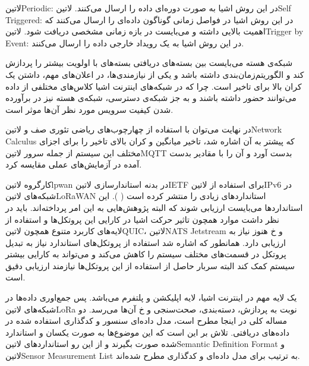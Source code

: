  ‌لاتین{Periodic}: در این روش اشیا به صورت دوره‌ای داده را ارسال می‌کنند.
 ‌لاتین{Self Triggered}: در این روش اشیا در فواصل زمانی گوناگون داده‌ای را ارسال می‌کنند که اهمیت بالایی داشته و می‌بایست در بازه زمانی مشخصی دریافت شود.
 ‌لاتین{Trigger by Event}: در این روش اشیا به یک رویداد خارجی داده را ارسال می‌کنند.

شبکه‌ی هسته می‌بایست بین بسته‌های دریافتی بسته‌های با اولویت بیشتر را پردازش کند و الگوریتم‌زمان‌بندی داشته باشد و یکی از نیازمندی‌ها، در اعلان‌های مهم، داشتن یک کران بالا برای تاخیر است.
چرا که در شبکه‌های اینترنت اشیا کلاس‌های مختلفی از داده می‌توانند حضور داشته باشند و به جز شبکه‌ی دسترسی، شبکه‌ی هسته نیز در برآورده شدن کیفیت سرویس مورد نظر آن‌ها موثر است.

در نهایت می‌توان با استفاده از چهارچوب‌های ریاضی تئوری صف و ‌لاتین{Network Calculus} که پیشتر به آن اشاره شد،
تاخیر میانگین و کران بالای تاخیر را برای اجزای مختلف این سیستم از جمله
سرور ‌لاتین{MQTT} بدست آورد و آن را با مقادیر بدست آمده در آزمایش‌های عملی
مقایسه کرد.


کارگروه ‌لاتین{lpwan} در بدنه استاندارسازی ‌لاتین{IETF} برای استفاده از ‌لاتین{IPv6} در شبکه‌های ‌لاتین{LoRaWAN} استانداردهای زیادی را منتشر کرده است ( ).
این استانداردها می‌بایست ارزیابی شوند که البته پژوهش‌هایی به این امر پرداخته‌اند. باید در نظر داشت موارد همچون تاثیر حرکت اشیا در کارایی این پروتکل‌ها و استفاده از لایه‌های کاربرد متنوع همچون ‌لاتین{QUIC}، ‌لاتین{NATS Jetstream} و ‌خ هنوز نیاز به ارزیابی دارد.
همانطور که اشاره شد استفاده از پروتکل‌های استاندارد نیاز به تبدیل پروتکل در قسمت‌های مختلف سیستم را کاهش می‌کند و می‌تواند به کارایی بیشتر سیستم کمک کند البته سربار حاصل از استفاده از این پروتکل‌ها نیازمند ارزیابی دقیق است.


یک لایه مهم در اینترنت اشیا، لایه اپلیکشن و پلتفرم می‌باشد. پس جمع‌اوری داده‌ها در شبکه‌های ‌لاتین{LoRa} نوبت به پردازش، دسته‌بندی، صحت‌سنجی و ‌خ
آن‌ها می‌رسد. دو مساله کلی در اینجا مطرح است، مدل داده‌ای سنسور و کدگذاری استفاده شده در داده‌های دریافتی. تلاش بر این است که این موضوع‌ها به صورت
یکسان و استاندارد شده صورت بگیرند و از این رو استانداردهای ‌لاتین{Semantic Definition Format} و ‌لاتین{Sensor Measurement List} به ترتیب برای مدل داده‌ای و کدگذاری مطرح شده‌اند.


